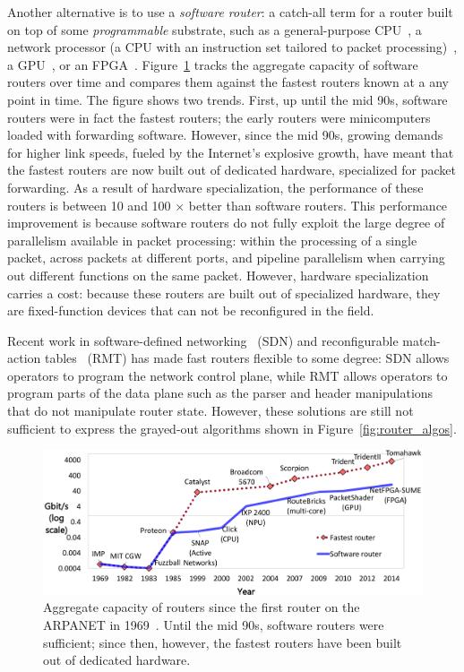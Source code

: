 Another alternative is to use a \textit{software router}: a catch-all term for
a router built on top of some \textit{programmable} substrate, such as a
general-purpose CPU~\cite{click, routebricks}, a network processor (a CPU with
an instruction set tailored to packet processing)~\cite{ixp4xx, ixp2800}, a
GPU~\cite{packetshader}, or an FPGA~\cite{netfpga}.
Figure~\ref{fig:router_evolution} tracks the aggregate capacity of software
routers over time and compares them against the fastest routers known at a any
point in time. The figure shows two trends. First, up until the mid 90s,
software routers were in fact the fastest routers; the early routers were
minicomputers loaded with forwarding software. However, since the mid 90s,
growing demands for higher link speeds, fueled by the Internet's explosive
growth, have meant that the fastest routers are now built out of dedicated
hardware, specialized for packet forwarding. As a result of hardware specialization,
the performance of these routers is between 10 and 100 $\times$ better than software routers. This performance improvement is because software routers do not fully
exploit the large degree of parallelism available in packet processing:
within the processing of a single packet, across packets at different ports,
and pipeline parallelism when carrying out different functions on the same
packet. However, hardware specialization carries a cost: because these routers are
built out of specialized hardware, they are fixed-function devices that can not be
reconfigured in the field.

Recent work in software-defined networking~\cite{openflow} (SDN) and
reconfigurable match-action tables~\cite{rmt} (RMT) has made fast routers
flexible to some degree: SDN allows operators to program the network control
plane, while RMT allows operators to program parts of the data plane such as
the parser and header manipulations that do not manipulate router state.
However, these solutions are still not sufficient to express the grayed-out
algorithms shown in Figure~\ref{fig:router_algos}.

\begin{figure}
\centering
\includegraphics[width=\columnwidth]{router_evolution.pdf}
\caption{Aggregate capacity of routers since the first router on the ARPANET in
1969~\cite{imp}. Until the mid 90s, software routers were sufficient; since
then, however, the fastest routers have been built out of dedicated hardware.}
\label{fig:router_evolution}
\end{figure}

